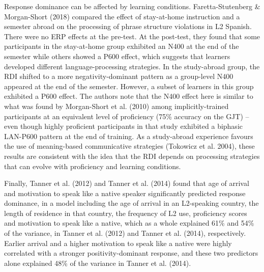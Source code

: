 \documentclass[11pt]{article}
\newenvironment{styleStandard}{\renewcommand\baselinestretch{1.0}\setlength\leftskip{0cm}\setlength\rightskip{0cm plus 1fil}\setlength\parindent{0cm}\setlength\parfillskip{0pt plus 1fil}\setlength\parskip{0in plus 1pt}\writerlistparindent\writerlistleftskip\leavevmode\normalfont\normalsize\writerlistlabel\ignorespaces}{\unskip\vspace{0.111in plus 0.0111in}\par}
\newcommand\writerlistleftskip{}
\newcommand\writerlistparindent{}
\newcommand\writerlistlabel{}
\begin{document}
\begin{styleStandard}
Response dominance can be affected by learning conditions. Faretta-Stutenberg \& Morgan-Short (2018) compared the effect of stay-at-home instruction and a semester abroad on the processing of phrase structure violations in L2 Spanish. There were no ERP effects at the pre-test. At the post-test, they found that some participants in the stay-at-home group exhibited an N400 at the end of the semester while others showed a P600 effect, which suggests that learners developed different language-processing strategies. In the study-abroad group, the RDI shifted to a more negativity-dominant pattern as a group-level N400 appeared at the end of the semester. However, a subset of learners in this group exhibited a P600 effect. The authors note that the N400 effect here is similar to what was found by Morgan-Short et al. (2010) among implicitly-trained participants at an equivalent level of proficiency (75\% accuracy on the GJT) – even though highly proficient participants in that study exhibited a biphasic LAN-P600 pattern at the end of training. As a study-abroad experience favours the use of meaning-based communicative strategies (Tokowicz et al. 2004), these results are consistent with the idea that the RDI depends on processing strategies that can evolve with proficiency and learning conditions.
\end{styleStandard}

\begin{styleStandard}
Finally, Tanner et al. (2012) and Tanner et al. (2014) found that age of arrival and motivation to speak like a native speaker significantly predicted response dominance, in a model including the age of arrival in an L2-speaking country, the length of residence in that country, the frequency of L2 use, proficiency scores and motivation to speak like a native, which as a whole explained 61\% and 54\% of the variance, in Tanner et al. (2012) and Tanner et al. (2014), respectively. Earlier arrival and a higher motivation to speak like a native were highly correlated with a stronger positivity-dominant response, and these two predictors alone explained 48\% of the variance in Tanner et al. (2014).
\end{styleStandard}
\end{document}
